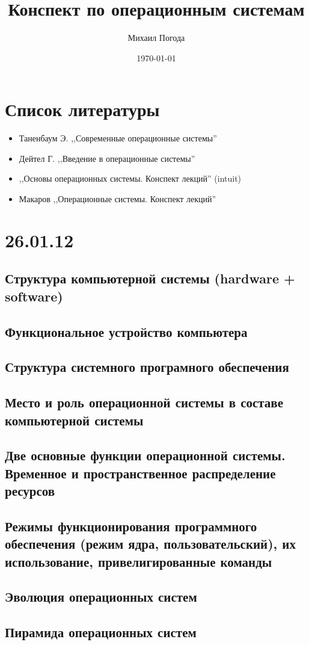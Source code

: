 \documentclass[a4paper,12pt,notitlepage,pdftex,headsepline]{scrartcl}
\author{Михаил Погода}
\title{Конспект по операционным системам}
\date{\today}
\begin{document}
\section{Список литературы}
  \begin{itemize}
    \item Таненбаум Э. ,,Современные операционные системы''
    \item Дейтел Г. ,,Введение в операционные системы''
    \item ,,Основы операционных системы. Конспект лекций'' (intuit)
    \item Макаров ,,Операционные системы. Конспект лекций''
  \end{itemize}
\section{26.01.12}
  \subsection{Структура компьютерной системы (hardware + software)}
  \subsection{Функциональное устройство компьютера}
  \subsection{Структура системного програмного обеспечения}
  \subsection{Место и роль операционной системы в составе компьютерной системы}
  \subsection{Две основные функции операционной системы. Временное и пространственное распределение ресурсов}
  \subsection{Режимы функционирования программного обеспечения (режим ядра, пользовательский), их использование, привелигированные команды}
  \subsection{Эволюция операционных систем}
  \subsection{Пирамида операционных систем}
\end{document}
